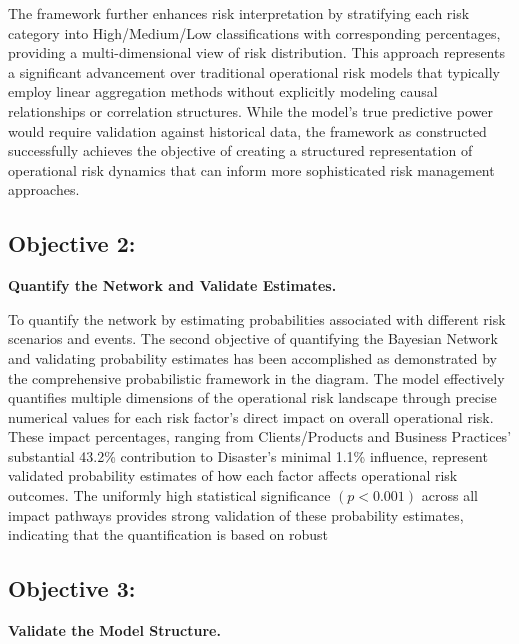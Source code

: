 The framework further enhances risk interpretation by stratifying each risk category into High/Medium/Low classifications with corresponding percentages, providing a multi-dimensional view of risk distribution. This approach represents a significant advancement over traditional operational risk models that typically employ linear aggregation methods without explicitly modeling causal relationships or correlation structures. While the model's true predictive power would require validation against historical data, the framework as constructed successfully achieves the objective of creating a structured representation of operational risk dynamics that can inform more sophisticated risk management approaches.
\subsection{Objective 2:}
\textbf{Quantify the Network and Validate Estimates.} 

To quantify the network by estimating probabilities associated with different risk scenarios and events.
The second objective of quantifying the Bayesian Network and validating probability estimates has been accomplished as demonstrated by the comprehensive probabilistic framework in the diagram. The model effectively quantifies multiple dimensions of the operational risk landscape through precise numerical values for each risk factor's direct impact on overall operational risk. These impact percentages, ranging from Clients/Products and Business Practices' substantial 43.2\% contribution to Disaster's minimal 1.1\% influence, represent validated probability estimates of how each factor affects operational risk outcomes. The uniformly high statistical significance $(p < 0.001)$ across all impact pathways provides strong validation of these probability estimates, indicating that the quantification is based on robust 
\subsection{Objective 3:}
\textbf{Validate the Model Structure.} 

